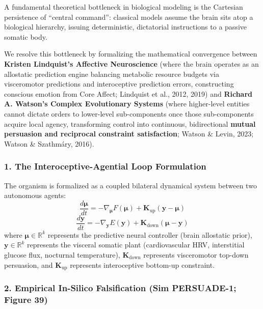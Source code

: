 \documentclass[
]{article}
\begin{document}
A fundamental theoretical bottleneck in biological modeling is the
Cartesian persistence of ``central command'': classical models assume
the brain sits atop a biological hierarchy, issuing deterministic,
dictatorial instructions to a passive somatic body.

We resolve this bottleneck by formalizing the mathematical convergence
between \textbf{Kristen Lindquist's Affective Neuroscience} (where the
brain operates as an allostatic prediction engine balancing metabolic
resource budgets via visceromotor predictions and interoceptive
prediction errors, constructing conscious emotion from Core Affect;
Lindquist et al., 2012, 2019) and \textbf{Richard A. Watson's Complex
Evolutionary Systems} (where higher-level entities cannot dictate orders
to lower-level sub-components once those sub-components acquire local
agency, transforming control into continuous, bidirectional
\textbf{mutual persuasion and reciprocal constraint satisfaction};
Watson \& Levin, 2023; Watson \& Szathmáry, 2016).

\subsubsection{1. The Interoceptive-Agential Loop
Formulation}\label{the-interoceptive-agential-loop-formulation}

The organism is formalized as a coupled bilateral dynamical system
between two autonomous agents:
\[\frac{d\boldsymbol{\mu}}{dt} = -\nabla_{\boldsymbol{\mu}} F(\boldsymbol{\mu}) + \mathbf{K}_{\mathrm{up}} (\mathbf{y} - \boldsymbol{\mu})\]
\[\frac{d\mathbf{y}}{dt} = -\nabla_{\mathbf{y}} E(\mathbf{y}) + \mathbf{K}_{\mathrm{down}} (\boldsymbol{\mu} - \mathbf{y})\]
where \(\boldsymbol{\mu} \in \mathbb{R}^k\) represents the predictive
neural controller (brain allostatic prior),
\(\mathbf{y} \in \mathbb{R}^k\) represents the visceral somatic plant
(cardiovascular HRV, interstitial glucose flux, nocturnal temperature),
\(\mathbf{K}_{\mathrm{down}}\) represents visceromotor top-down
persuasion, and \(\mathbf{K}_{\mathrm{up}}\) represents interoceptive
bottom-up constraint.

\subsubsection{2. Empirical In-Silico Falsification (Sim PERSUADE-1;
Figure
39)}\label{empirical-in-silico-falsification-sim-persuade-1-figure-39}
\end{document}

